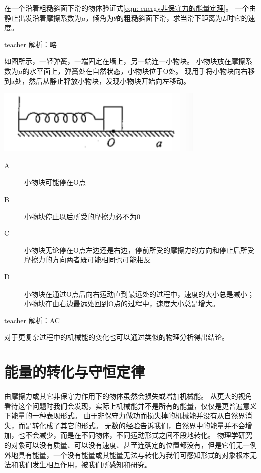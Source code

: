 \begin{example}
在一个沿着粗糙斜面下滑的物体验证式\ref{eqn: energy非保守力的能量定理}。
一个由静止出发沿着摩擦系数为$\mu$，倾角为$\theta$的粗糙斜面下滑，求当滑下距离为$L$时它的速度。
	\begin{taggedblock}{teacher}
		\newline
		解析：略
	\end{taggedblock}
\end{example}


\begin{example}

如图所示，一轻弹簧，一端固定在墙上，另一端连一小物块。
小物块放在摩擦系数为$\mu$的水平面上，弹簧处在自然状态，小物块位于O处。
现用手将小物块向右移到a处，然后从静止释放小物块，发现小物块开始向左移动。
\begin{flushright}
\includegraphics{images/energy-7.pdf}
\end{flushright}

\begin{description}
\item[ A]小物块可能停在O点
\item[B] 小物块停止以后所受的摩擦力必不为0
\item[C] 小物块无论停在O点左边还是右边，停前所受的摩擦力的方向和停止后所受摩擦力的方向两者既可能相同也可能相反
\item[D] 小物块在通过O点后向右运动直到最远处的过程中，速度的大小总是减小；小物块在由右边最远处回到O点的过程中，速度大小总是增大。
\end{description}
	\begin{taggedblock}{teacher}
		\noindent
		解析：AC
	\end{taggedblock}
\end{example}
对于更复杂过程中的机械能的变化也可以通过类似的物理分析得出结论。



\section{能量的转化与守恒定律}
由摩擦力或其它非保守力作用下的物体虽然会损失或增加机械能。
从更大的视角看待这个问题时我们会发现，实际上机械能并不是所有的能量，仅仅是更普遍意义下能量的一种表现形式。
由于非保守力做功而损失掉的机械能并没有从自然界消失，而是转化成了其它的形式。
无数的经验告诉我们，自然界中的能量并不会增加，也不会减少，而是在不同物体，不同运动形式之间不段地转化。
物理学研究的对象可以没有质量、可以没有速度、甚至连确定的位置都没有，但是它们无一例外地具有能量，一个没有能量或其能量无法与转化为我们可感知形式的对象根本无法和我们发生相互作用，被我们所感知和研究。

